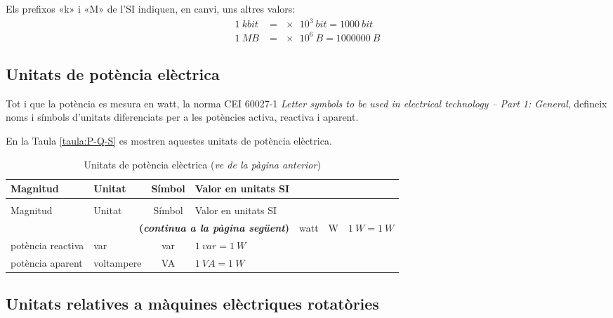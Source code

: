 Els prefixos «k» i «M» de l'SI indiquen, en canvi, uns altres valors:
\begin{align*}
	\qty{1}{kbit} &= \qty[print-unity-mantissa = false]{e3}{bit} = \qty{1000}{bit} \\
	\qty{1}{MB} &=\qty[print-unity-mantissa = false]{e6}{B} = \qty{1000000}{B}
\end{align*}


\subsection{Unitats de potència elèctrica}

Tot i que la potència es mesura en watt, la norma CEI 60027-1 \textit{Letter symbols to be used in electrical technology -- Part 1: General}, defineix noms i símbols d'unitats diferenciats per a les potències activa, reactiva i aparent.

En la Taula \vref{taula:P-Q-S} es mostren aquestes unitats de potència elèctrica.

\begin{longtable}[h]{llcl}
   \caption{\label{taula:P-Q-S} Unitats de potència elèctrica}\\
   \toprule[1pt]
    Magnitud & Unitat &  Símbol & Valor en unitats SI \\
   \midrule
   \endfirsthead
   \caption[]{Unitats de potència elèctrica (\emph{ve de la pàgina anterior})}\\
   \toprule[1pt]
    Magnitud & Unitat &  Símbol & Valor en unitats SI \\
   \midrule
   \endhead
   \midrule
   \multicolumn{4}{r}{\sffamily\bfseries\color{NavyBlue}(\emph{continua a la pàgina següent})}
   \endfoot
   \endlastfoot
   potència activa & watt &  \unit{W}& $\qty{1}{W} = \qty{1}{W}$  \\
   potència reactiva & var &  \unit{var}& $\qty{1}{var} = \qty{1}{W}$  \\
   potència aparent & voltampere &  \unit{VA}& $\qty{1}{VA} = \qty{1}{W}$  \\
   \bottomrule[1pt]
\end{longtable}




\subsection{Unitats relatives a màquines elèctriques rotatòries}\label{sec:unit-maq-rotativ}

